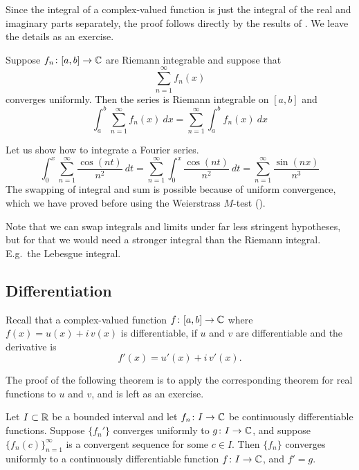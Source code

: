 Since the integral of a complex-valued function is just the integral of
the real and imaginary parts separately,
the proof follows directly by the results of
.
We leave the details as an exercise.

\begin{cor}
Suppose $f_n \colon [a,b] \to {\mathbb{C}}$
are Riemann integrable and suppose that
\begin{equation*}
\sum_{n=1}^\infty f_n(x)
\end{equation*}
converges uniformly.  Then the series is Riemann integrable on $[a,b]$
and
\begin{equation*}
\int_a^b \sum_{n=1}^\infty f_n(x) ~dx
=
\sum_{n=1}^\infty \int_a^b f_n(x) ~dx
\end{equation*}
\end{cor}

\begin{example}
Let us show how to integrate a Fourier series.
\begin{equation*}
\int_{0}^x \sum_{n=1}^\infty \frac{\cos(nt)}{n^2} ~dt
=
\sum_{n=1}^\infty \int_{0}^x \frac{\cos(nt)}{n^2}~dt
=
\sum_{n=1}^\infty \frac{\sin(nx)}{n^3}
\end{equation*}
The swapping of integral and sum is possible because of uniform convergence,
which we have proved before using the Weierstrass $M$-test
().
\end{example}

Note that we can swap integrals and limits under far less stringent hypotheses,
but for that we would need a stronger integral than the Riemann integral.
E.g.\ the Lebesgue integral.

\subsection{Differentiation}

Recall that a complex-valued function
$f \colon [a,b] \to {\mathbb{C}}$ where $f(x) = u(x)+i\,v(x)$
is differentiable, if $u$ and $v$ are differentiable
and the derivative is
\begin{equation*}
f'(x) = u'(x)+i\,v'(x) .
\end{equation*}

The proof of the following theorem is to apply the corresponding theorem for
real functions to $u$ and $v$, and is left as an exercise.

\begin{thm} \label{thm:dersconvergecomplex}
Let $I \subset {\mathbb{R}}$ be a bounded interval and let
$f_n \colon I \to {\mathbb{C}}$ be continuously differentiable functions.
Suppose $\{ f_n' \}$ converges uniformly to $g \colon I \to {\mathbb{C}}$,
and suppose $\{ f_n(c) \}_{n=1}^\infty$ is a
convergent sequence for some $c \in I$.  Then $\{ f_n \}$ converges uniformly to 
a continuously differentiable function $f \colon I \to {\mathbb{C}}$, and $f' = g$.
\end{thm}

